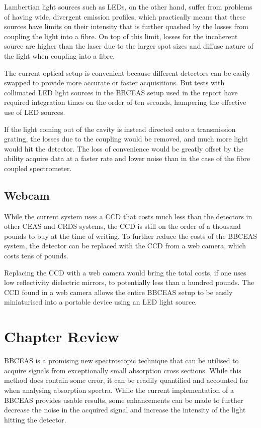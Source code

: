 Lambertian light sources such as \acp{LED}, on the other hand, suffer from
problems of having wide, divergent emission profiles, which practically means
that these sources have limits on their intensity that is further quashed by
the losses from coupling the light into a fibre. On top of this limit, losses
for the incoherent source are higher than the laser due to the larger spot
sizes and diffuse nature of the light when coupling into a fibre.

The current optical setup is convenient because different detectors can be
easily swapped to provide more accurate or faster acquisitions. But tests with
collimated \ac{LED} light sources in the \ac{BBCEAS} setup used in the report
have required integration times on the order of ten seconds, hampering the
effective use of \ac{LED} sources.

If the light coming out of the cavity is instead directed onto a transmission
grating, the losses due to the coupling would be removed, and much more light
would hit the detector. The loss of convenience would be greatly offset by the
ability acquire data at a faster rate and lower noise than in the case of the
fibre coupled spectrometer.



\subsection{Webcam}\label{subsec:bbceas_webcam}

While the current system uses a \ac{CCD} that costs much less than the
detectors in other \ac{CEAS} and \ac{CRDS} systems, the \ac{CCD} is still on
the order of a thousand pounds to buy at the time of writing. To further reduce
the costs of the \ac{BBCEAS} system, the detector can be replaced with the
\ac{CCD} from a web camera, which costs tens of pounds.

Replacing the \ac{CCD} with a web camera would bring the total costs, if one
uses low reflectivity dielectric mirrors, to potentially less than a hundred
pounds. The \ac{CCD} found in a web camera allows the entire \ac{BBCEAS} setup
to be easily miniaturised into a portable device using an \ac{LED} light
source.


\section*{Chapter Review}

\ac{BBCEAS} is a promising new spectroscopic technique that can be utilised to
acquire signals from exceptionally small absorption cross sections. While this
method does contain some error, it can be readily quantified and accounted
for when analysing absorption spectra. While the current implementation of a
\ac{BBCEAS} provides usable results, some enhancements can be made to further
decrease the noise in the acquired signal and increase the intensity of the
light hitting the detector.

